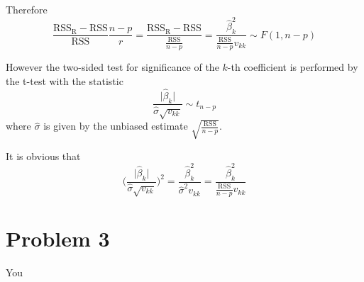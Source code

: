 \documentclass[a4paper]{article}
\newcommand{\R}{\text{R}}
\newcommand{\RSS}{\text{RSS}}
\begin{document}
Therefore 
\[ \frac{\RSS_\R - \RSS}{\RSS}\frac{n-p}{r} = \frac{\RSS_\R - \RSS}{\frac{\RSS}{n-p}} = \frac{\hat{\beta}_k^2}{\frac{\RSS}{n-p}v_{kk}} \sim F(1,n-p)\]

However the two-sided test for significance of the $k$-th coefficient is performed by the t-test with the statistic
\[\frac{\lvert \hat{\beta}_k \rvert}{\hat{\sigma}\sqrt{v_{kk}}}\sim t_{n-p}\] where $\hat{\sigma}$ is given by the unbiased estimate $\sqrt{\frac{\RSS}{n-p}}$.

It is obvious that 
\[\bigg(\frac{\lvert \hat{\beta}_k \rvert}{\hat{\sigma}\sqrt{v_{kk}}}\bigg)^2 = \frac{\hat{\beta}_k^2}{\hat{\sigma}^2 v_{kk}} = \frac{\hat{\beta}_k^2}{\frac{\RSS}{n-p} v_{kk}} \]


\section{Problem 3} %
\label{sec:problem_3}

You

\end{document}
